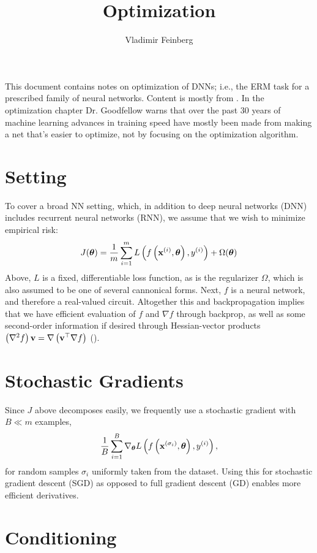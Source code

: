\documentclass{article}
\title{Optimization}
\author{Vladimir Feinberg}
\begin{document}
\maketitle

This document contains notes on optimization of DNNs; i.e., the ERM task for a prescribed family of neural networks. Content is mostly from . In the optimization chapter Dr. Goodfellow warns that over the past 30 years of machine learning advances in training speed have mostly been made from making a net that's easier to optimize, not by focusing on the optimization algorithm.

\section{Setting}

To cover a broad NN setting, which, in addition to deep neural networks (DNN) includes recurrent neural networks (RNN), we assume that we wish to minimize empirical risk:
$$
J({\boldsymbol\theta})=\frac{1}{m}\sum_{i=1}^mL\left({f\left({\textbf{x}^{(i)}, {\boldsymbol\theta}}\right), y^{(i)}}\right) + \Omega({\boldsymbol\theta})
$$
Above, $L$ is a fixed, differentiable loss function, as is the regularizer $\Omega$, which is also assumed to be one of several cannonical forms. Next, $f$ is a neural network, and therefore a real-valued circuit. Altogether this and backpropagation implies that we have efficient evaluation of $f$ and $\nabla f$ through backprop, as well as some second-order information if desired through Hessian-vector products $\left({\nabla^2 f}\right)\textbf{v}=\nabla\left({\textbf{v}^\top\nabla f}\right)$ ().

\section{Stochastic Gradients}

Since $J$ above decomposes easily, we frequently use a stochastic gradient with $B\ll m$ examples,
$$\frac{1}{B}\sum_{i=1}^B\nabla_{\boldsymbol\theta} L\left({f\left({\textbf{x}^{(\sigma_i)}, {\boldsymbol\theta}}\right), y^{(i)}}\right),$$ for random samples $\sigma_i$ uniformly taken from the dataset. Using this for stochastic gradient descent (SGD) as opposed to full gradient descent (GD) enables more efficient derivatives.

\section{Conditioning}
\end{document}
